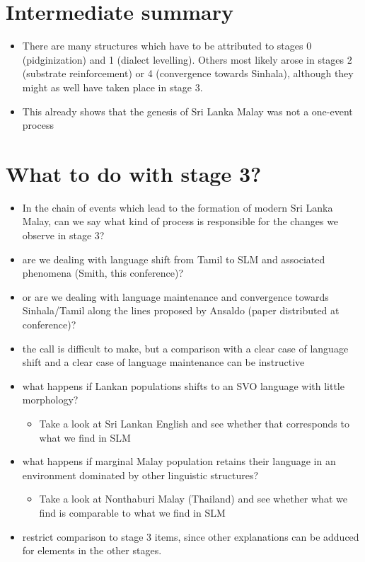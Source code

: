 \documentclass[a4paper,12pt]{article}
\begin{document}
\section{Intermediate summary}
\begin{itemize}
 \item There are many structures which have to be attributed to stages 0 (pidginization) and 1 (dialect levelling). Others most likely arose in stages 2 (substrate reinforcement) or 4 (convergence towards Sinhala), although they might as well have taken place in stage 3. 
 \item This already shows that the genesis of Sri Lanka Malay was not a one-event process
\end{itemize}

\section{What to do with stage 3?}  
\begin{itemize} 
 \item In the chain of events which lead to the formation of modern Sri Lanka Malay, can we say what kind of process is responsible for the changes we observe in  stage 3?
 \item are we dealing with language shift from Tamil to SLM and associated phenomena (Smith, this conference)?
 \item or are we dealing with language maintenance and convergence towards Sinhala/Tamil along the lines proposed by Ansaldo (paper distributed at conference)?
 \item the call is difficult to make, but a comparison with a clear case of language shift and a clear case of language maintenance can be instructive
 \item what happens if Lankan populations shifts to an SVO language with little morphology? 
  \begin{itemize}
  \item Take a look at Sri Lankan English and see whether that corresponds to what we find in SLM
  \end{itemize}
 \item what happens if marginal Malay population retains their language in an environment dominated by other linguistic structures?  
  \begin{itemize}
  \item Take a look at Nonthaburi Malay (Thailand) \citep{Tadmor1995phd} and see whether what we find is comparable to what we find in SLM
  \end{itemize}
  \item restrict comparison to stage 3 items, since other explanations can be adduced for elements in the other stages.
\end{itemize}
 
\end{document}
